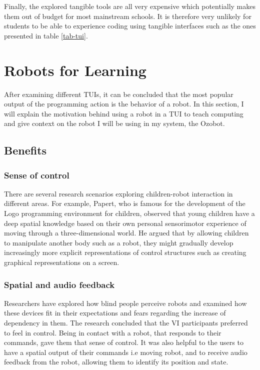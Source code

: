 \documentclass[oneside,%
                    author={Malak Hajji},
                    degree={BSc},
                    title={Designing An Accessible Ozobot Programming Platform for Students},
                  subtitle={With Mixed Visual Abilities}]{dissertation}
\begin{document}
Finally, the explored tangible tools are all very expensive which potentially makes them out of budget for most mainstream schools. It is therefore very unlikely for students to be able to experience coding using tangible interfaces such as the ones presented in table \ref{tab-tui}.

\section{Robots for Learning}

After examining different TUIs, it can be concluded that the most popular output of the programming action is the behavior of a robot. In this section, I will explain the motivation behind using a robot in a TUI to teach computing and give context on the robot I will be using in my system, the Ozobot.

\subsection{Benefits}

\subsubsection{Sense of control}
There are several research scenarios exploring children-robot interaction in different areas. For example, Papert, who is famous for the development of the Logo programming environment for children, observed that young children have a deep spatial knowledge based on their own personal sensorimotor experience of moving through a three-dimensional world. He argued that by allowing children to manipulate another body such as a robot, they might gradually develop increasingly more explicit representations of control structures such as creating graphical representations on a screen.\cite{papert}
\subsubsection{Spatial and audio feedback}
Researchers have explored how blind people perceive robots and examined how these devices fit in their expectations and fears regarding the increase of dependency in them\cite{feedback}. The research concluded that the VI participants preferred to feel in control. Being in contact with a robot, that responds to their commands, gave them that sense of control. It was also helpful to the users to have a spatial output of their commands i.e moving robot, and to receive audio feedback from the robot, allowing them to identify its position and state. 
\end{document}

